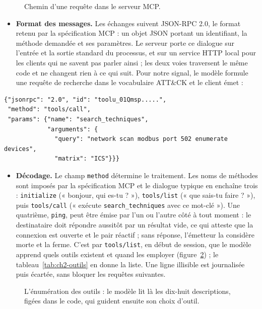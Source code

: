 \begin{figure}[htbp]
\centering
{}
\caption{Chemin d'une requête dans le serveur MCP.}\label{fig:ch2-chemin}
\end{figure}

\begin{itemize}
\tightlist
\item
  \textbf{Format des messages.} Les échanges suivent JSON-RPC 2.0, le format retenu par la spécification MCP : un objet JSON portant un identifiant, la méthode demandée et ses paramètres. Le serveur porte ce dialogue sur l'entrée et la sortie standard du processus, et sur un service HTTP local pour les clients qui ne savent pas parler ainsi ; les deux voies traversent le même code et ne changent rien à ce qui suit. Pour notre signal, le modèle formule une requête de recherche dans le vocabulaire ATT\&CK et le client émet :
\end{itemize}

\begin{verbatim}
{"jsonrpc": "2.0", "id": "toolu_01Qmsp.....",
 "method": "tools/call",
 "params": {"name": "search_techniques",
            "arguments": {
              "query": "network scan modbus port 502 enumerate devices",
              "matrix": "ICS"}}}
\end{verbatim}

\begin{itemize}
\tightlist
\item
  \textbf{Décodage.} Le champ \texttt{method} détermine le traitement. Les noms de méthodes sont imposés par la spécification MCP et le dialogue typique en enchaîne trois : \texttt{initialize} (« bonjour, qui es-tu ? »), \texttt{tools/list} (« que sais-tu faire ? »), puis \texttt{tools/call} (« exécute \texttt{search\_techniques} avec ce mot-clé »). Une quatrième, \texttt{ping}, peut être émise par l'un ou l'autre côté à tout moment : le destinataire doit répondre aussitôt par un résultat vide, ce qui atteste que la connexion est ouverte et le pair réactif ; sans réponse, l'émetteur la considère morte et la ferme. C'est par \texttt{tools/list}, en début de session, que le modèle apprend quels outils existent et quand les employer (figure~\ref{fig:ch2-outils}) ; le tableau~\ref{tab:ch2-outils} en donne la liste. Une ligne illisible est journalisée puis écartée, sans bloquer les requêtes suivantes.
\end{itemize}

\begin{figure}[htbp]
\centering
{}
\caption{L'énumération des outils : le modèle lit là les dix-huit descriptions, figées dans le code, qui guident ensuite son choix d'outil.}\label{fig:ch2-outils}
\end{figure}


